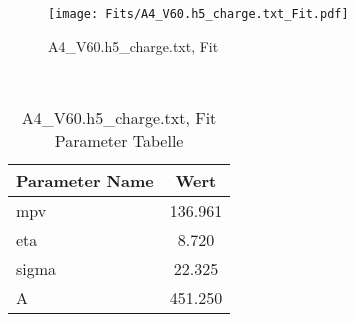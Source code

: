 \begin{figure}[ht] 
 	\centering 
 	\texttt{[image: Fits/A4\_V60.h5\_charge.txt\_Fit.pdf]} 
	\caption{A4_V60.h5_charge.txt, Fit} 
 	\label{fig:A4_V60.h5_charge.txt, Fit} 
\end{figure}
 \\ 
\begin{table}[ht] 
\centering 
\caption{A4_V60.h5_charge.txt, Fit Parameter Tabelle} 
\label{tab:my-table}
\begin{tabular}{|l|c|}
\hline
Parameter Name	&	Wert \\ \hline
mpv	&	 136.961\\ \hline
eta	&	 8.720\\ \hline
sigma	&	 22.325\\ \hline
A	&	 451.250\\ \hline
\end{tabular} 
\end{table}